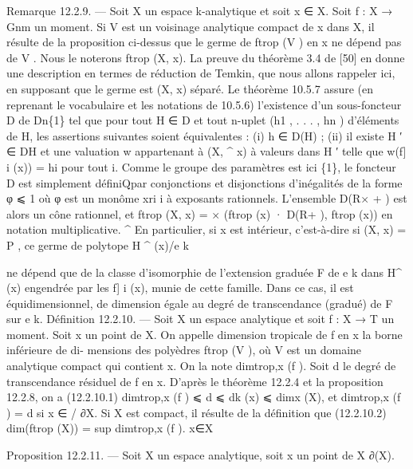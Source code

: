 \documentclass[
  10pt,
]{article}
\newenvironment{Shaded}{}{}
\newcommand{\NormalTok}[1]{#1}
\begin{document}
\begin{Shaded}
\begin{Highlighting}[]
\NormalTok{Remarque 12.2.9. — Soit X un espace k{-}analytique et soit x ∈ X. Soit f : X → Gnm}
\NormalTok{un moment. Si V est un voisinage analytique compact de x dans X, il résulte de la}
\NormalTok{proposition ci{-}dessus que le germe de ftrop (V ) en x ne dépend pas de V . Nous le noterons}
\NormalTok{ftrop (X, x).}
\NormalTok{   La preuve du théorème 3.4 de [50] en donne une description en termes de réduction}
\NormalTok{de Temkin, que nous allons rappeler ici, en supposant que le germe est (X, x) séparé.}
\NormalTok{   Le théorème 10.5.7 assure (en reprenant le vocabulaire et les notations de 10.5.6)}
\NormalTok{l’existence d’un sous{-}foncteur D de Dn\{1\} tel que pour tout H ∈ D et tout n{-}uplet}
\NormalTok{(h1 , . . . , hn ) d’éléments de H, les assertions suivantes soient équivalentes :}
\NormalTok{   (i) h ∈ D(H) ;}
\NormalTok{   (ii) il existe H ′ ∈ DH et une valuation w appartenant à (X,   \^{}   x) à valeurs dans H ′ telle}
\NormalTok{que w(f]     i (x)) = hi pour tout i.}
\NormalTok{Comme le groupe des paramètres est ici \{1\}, le foncteur D est simplement définiQpar}
\NormalTok{conjonctions et disjonctions d’inégalités de la forme φ ⩽ 1 où φ est un monôme xri i}
\NormalTok{à exposants rationnels. L’ensemble D(R×      + ) est alors un cône rationnel, et ftrop (X, x) =}
\NormalTok{                ×}
\NormalTok{(ftrop (x) · D(R+ ), ftrop (x)) en notation multiplicative.}
\NormalTok{                                                      \^{}}
\NormalTok{  En particulier, si x est intérieur, c’est{-}à{-}dire si (X, x) = P       , ce germe de polytope}
\NormalTok{                                                                 H}
\NormalTok{                                                                 \^{} (x)/e}
\NormalTok{                                                                       k}

\NormalTok{ne dépend que de la classe d’isomorphie de l’extension graduée F de e       k dans H\^{}  (x)}
\NormalTok{engendrée par les f]}
\NormalTok{                   i (x), munie de cette famille. Dans ce cas, il est équidimensionnel, de}
\NormalTok{dimension égale au degré de transcendance (gradué) de F sur e    k.}
\NormalTok{Définition 12.2.10. — Soit X un espace analytique et soit f : X → T un moment.}
\NormalTok{Soit x un point de X. On appelle dimension tropicale de f en x la borne inférieure de di{-}}
\NormalTok{mensions des polyèdres ftrop (V ), où V est un domaine analytique compact qui contient x.}
\NormalTok{On la note dimtrop,x (f ).}
\NormalTok{  Soit d le degré de transcendance résiduel de f en x. D’après le théorème 12.2.4 et la}
\NormalTok{proposition 12.2.8, on a}
\NormalTok{(12.2.10.1)                 dimtrop,x (f ) ⩽ d ⩽ dk (x) ⩽ dimx (X),}
\NormalTok{et dimtrop,x (f ) = d si x ∈}
\NormalTok{                           / ∂X. Si X est compact, il résulte de la définition que}
\NormalTok{(12.2.10.2)                   dim(ftrop (X)) = sup dimtrop,x (f ).}
\NormalTok{                                                x∈X}

\NormalTok{Proposition 12.2.11. — Soit X un espace analytique, soit x un point de X ∂(X).}
\end{Highlighting}
\end{Shaded}
\end{document}
